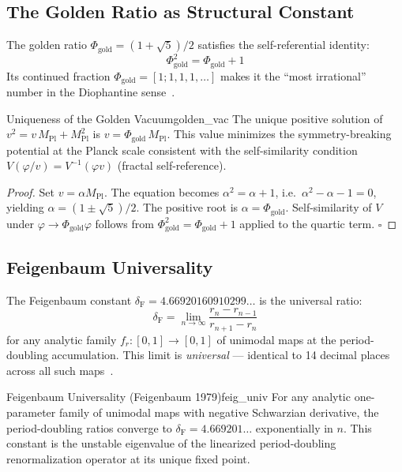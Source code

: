 \documentclass[12pt,a4paper]{article}
\newcommand{\MPl}{M_{\mathrm{Pl}}}
\newcommand{\Feig}{\delta_{\mathrm{F}}}
\numberwithin{equation}{section}
\begin{document}
\subsection{The Golden Ratio as Structural Constant}

The golden ratio $\Phi_{\mathrm{gold}} = (1+\sqrt5)/2$ satisfies the self-referential identity:
\begin{equation}
  \Phi_{\mathrm{gold}}^2 = \Phi_{\mathrm{gold}} + 1
  \label{eq:golden_identity}
\end{equation}
Its continued fraction $\Phi_{\mathrm{gold}} = [1;1,1,1,\ldots]$ makes it
the ``most irrational'' number in the Diophantine sense~\citep{Livio2002}.

\begin{theorem}{Uniqueness of the Golden Vacuum}{golden_vac}
The unique positive solution of $v^2 = v\,\MPl + \MPl^2$ is
$v = \Phi_{\mathrm{gold}}\,\MPl$.
This value minimizes the symmetry-breaking potential at the Planck scale
consistent with the self-similarity condition $V(\varphi/v) = V^{-1}(\varphi v)$
(fractal self-reference).
\end{theorem}
\begin{proof}
Set $v = \alpha\MPl$. The equation becomes $\alpha^2 = \alpha + 1$, i.e.\ 
$\alpha^2 - \alpha - 1 = 0$, yielding $\alpha = (1\pm\sqrt5)/2$.
The positive root is $\alpha = \Phi_{\mathrm{gold}}$.
Self-similarity of $V$ under $\varphi \to \Phi_{\mathrm{gold}}\varphi$ follows from
$\Phi_{\mathrm{gold}}^2 = \Phi_{\mathrm{gold}}+1$ applied to the quartic term. $\square$
\end{proof}

\subsection{Feigenbaum Universality}

The Feigenbaum constant $\Feig = 4.66920160910299\ldots$ is the universal ratio:
\begin{equation}
  \Feig = \lim_{n\to\infty}\frac{r_n - r_{n-1}}{r_{n+1} - r_n}
  \label{eq:feigenbaum}
\end{equation}
for any analytic family $f_r: [0,1]\to[0,1]$ of unimodal maps at the period-doubling
accumulation. This limit is \emph{universal} --- identical to 14 decimal places
across all such maps~\citep{Feigenbaum1978,Feigenbaum1979}.

\begin{theorem}{Feigenbaum Universality (Feigenbaum 1979)}{feig_univ}
For any analytic one-parameter family of unimodal maps with negative Schwarzian
derivative, the period-doubling ratios converge to
$\Feig = 4.669201\ldots$ exponentially in $n$.
This constant is the unstable eigenvalue of the linearized period-doubling
renormalization operator at its unique fixed point.
\end{theorem}
\end{document}
